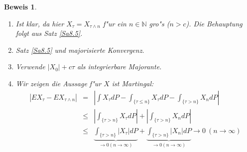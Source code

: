 \documentclass[a4paper,11pt]{book}
\newcommand{\N}{{\mathbb N}}
\theoremstyle{nonumberplain}
\newtheorem{Bew}{Beweis}
\begin{document}
\begin{Bew}

\begin{enumerate}
\item Ist klar, da hier $X_{\tau} = X_{\tau \wedge n}$ f"ur ein $n \in \N$ gro"s ($n > c$). Die Behauptung folgt aus Satz \ref{Sa8.5}.

\item Satz \ref{Sa8.5} und majorisierte Konvergenz.

\item Verwende $|X_0| + c\tau$ als integrierbare Majorante.

\item Wir zeigen die Aussage f"ur $X$ ist Martingal:
\begin{eqnarray*}
|EX_{\tau} - EX_{\tau \wedge n}| & = & |\int X_{\tau}dP - \int_{\{\tau \leq n\}} X_{\tau} dP - \int_{\{\tau > n\}} X_n dP| \\
& \leq & | \int_{\{\tau > n\}} X_{\tau} dP| + |\int_{\{\tau > n\}} X_n dP| \\
& \leq & \underbrace{\int_{\{\tau > n\}} |X_{\tau}| dP}_{\rightarrow 0 (n \rightarrow \infty)} + \underbrace{ \int_{\{\tau > n\}} |X_n| dP}_{\rightarrow 0 (n \rightarrow \infty)} \rightarrow 0 \ (n \rightarrow \infty)
\end{eqnarray*}
\end{enumerate}
\end{Bew}
\end{document}
